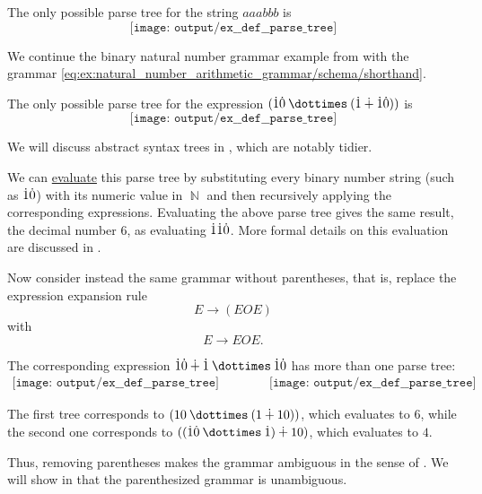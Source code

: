 \begin{example}
\begin{thmenum}
    The only possible parse tree for the string \( aaabbb \) is
    \begin{equation*}
      \texttt{[image: output/ex\_\_def\_\_parse\_tree]}
    \end{equation*}

     We continue the binary natural number grammar example from  with the grammar \eqref{eq:ex:natural_number_arithmetic_grammar/schema/shorthand}.

    The only possible parse tree for the expression \( (\syn1 \syn0 \syntimes (\syn1 \synplus \syn1 \syn0)) \) is
    \begin{equation*}
      \texttt{[image: output/ex\_\_def\_\_parse\_tree]}
    \end{equation*}

    We will discuss abstract syntax trees in , which are notably tidier.

    We can \hyperref[con:evaluation]{evaluate} this parse tree by substituting every binary number string (such as \( \dot{1} \dot{0} \)) with its numeric value in \( \BbbN \) and then recursively applying the corresponding expressions. Evaluating the above parse tree gives the same result, the decimal number \( 6 \), as evaluating \( \dot{1} \dot{1} \dot{0} \). More formal details on this evaluation are discussed in .

    Now consider instead the same grammar without parentheses, that is, replace the expression expansion rule
    \begin{equation*}
      E \to (E O E)
    \end{equation*}
    with
    \begin{equation*}
      E \to E O E.
    \end{equation*}

    The corresponding expression \( \syn1 \syn0 \synplus \syn1 \syntimes \syn1 \syn0 \) has more than one parse tree:
    \begin{equation*}
      \begin{aligned}
        \texttt{[image: output/ex\_\_def\_\_parse\_tree]}
        \qquad\qquad
        \texttt{[image: output/ex\_\_def\_\_parse\_tree]}
      \end{aligned}
    \end{equation*}

    The first tree corresponds to \( (10 \syntimes (1 \synplus 10)) \), which evaluates to \( 6 \), while the second one corresponds to \( ((\syn1 \syn0 \syntimes \syn1) \synplus 10) \), which evaluates to \( 4 \).

    Thus, removing parentheses makes the grammar ambiguous in the sense of . We will show in  that the parenthesized grammar is unambiguous.
  \end{thmenum}
\end{example}

